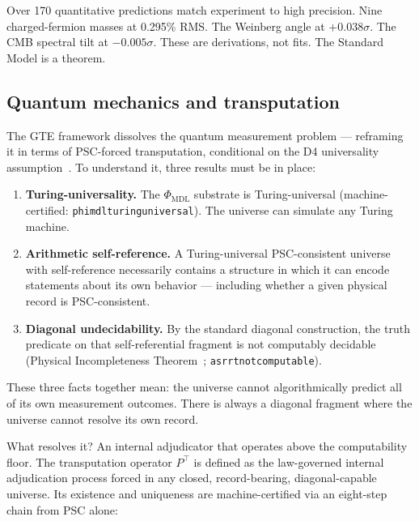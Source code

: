 \documentclass[11pt]{article}
\theoremstyle{remark}
\newcommand{\PHIMDL}{\Phi_{\mathrm{MDL}}}
\newcommand{\lean}[1]{%
  \penalty-100
  \begingroup\def\_{\textunderscore\allowbreak}\texttt{#1}\endgroup}
\begin{document}
Over 170 quantitative predictions match experiment to high precision. Nine
charged-fermion masses at 0.295\% RMS. The Weinberg angle at $+0.038\sigma$. The CMB
spectral tilt at $-0.005\sigma$. These are derivations, not fits. The Standard Model
is a theorem.

\subsection{Quantum mechanics and transputation}

The GTE framework dissolves the quantum measurement problem --- reframing it in terms
of PSC-forced transputation, conditional on the D4 universality
assumption~\cite{SpivackPolynomialTransputation}. To understand it, three
results must be in place:

\begin{enumerate}
  \item \textbf{Turing-universality.} The $\PHIMDL$ substrate is Turing-universal
    (machine-certified: \lean{phimdl\_turing\_universal}). The universe can simulate
    any Turing machine.

  \item \textbf{Arithmetic self-reference.} A Turing-universal PSC-consistent universe
    with self-reference necessarily contains a structure in which it can encode
    statements about its own behavior --- including whether a given physical record is
    PSC-consistent.

  \item \textbf{Diagonal undecidability.} By the standard diagonal construction, the
    truth predicate on that self-referential fragment is not computably decidable
    (Physical Incompleteness Theorem~\cite{SpivackNEMS11};
    \lean{asr\_rt\_not\_computable}).
\end{enumerate}

These three facts together mean: the universe cannot algorithmically predict all of
its own measurement outcomes. There is always a diagonal fragment where the universe
cannot resolve its own record.

What resolves it? An internal adjudicator that operates above the computability floor.
The transputation operator $P^\top$ is defined as the law-governed internal adjudication
process forced in any closed, record-bearing, diagonal-capable universe. Its existence
and uniqueness are machine-certified via an eight-step chain from PSC alone:
\end{document}
